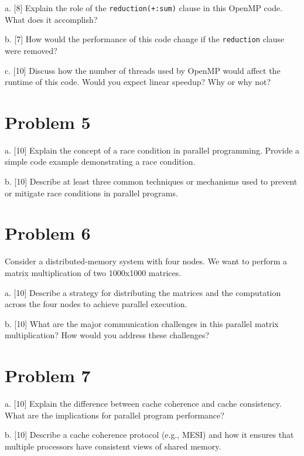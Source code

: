 \documentclass{article}
\begin{document}
a. [8] Explain the role of the \texttt{reduction(+:sum)} clause in this OpenMP code. What does it accomplish?

b. [7] How would the performance of this code change if the \texttt{reduction} clause were removed?

c. [10]  Discuss how the number of threads used by OpenMP would affect the runtime of this code.  Would you expect linear speedup? Why or why not?



\section*{Problem 5}
a. [10] Explain the concept of a race condition in parallel programming. Provide a simple code example demonstrating a race condition.


b. [10] Describe at least three common techniques or mechanisms used to prevent or mitigate race conditions in parallel programs.


\section*{Problem 6}
Consider a distributed-memory system with four nodes.  We want to perform a matrix multiplication of two 1000x1000 matrices.

a. [10] Describe a strategy for distributing the matrices and the computation across the four nodes to achieve parallel execution.

b. [10] What are the major communication challenges in this parallel matrix multiplication?  How would you address these challenges?


\section*{Problem 7}
a. [10] Explain the difference between cache coherence and cache consistency.  What are the implications for parallel program performance?

b. [10] Describe a cache coherence protocol (e.g., MESI) and how it ensures that multiple processors have consistent views of shared memory.
\end{document}
